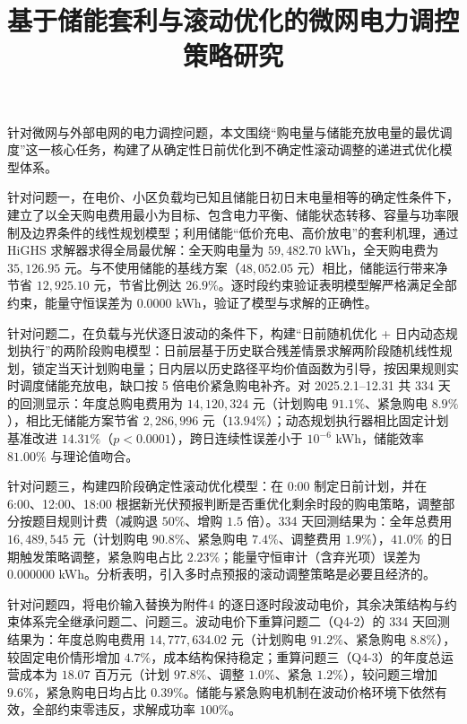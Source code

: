 \documentclass[zihao=-4,a4paper,UTF8,fontset=none]{ctexart}
\title{基于储能套利与滚动优化的微网电力调控策略研究}
\newcommand{\keywords}{微网调度；储能套利；线性规划；随机优化；动态规划}
\begin{document}
\maketitle

\begin{cumcmabstract}
针对微网与外部电网的电力调控问题，本文围绕“购电量与储能充放电量的最优调度”这一核心任务，构建了从确定性日前优化到不确定性滚动调整的递进式优化模型体系。

针对问题一，在电价、小区负载均已知且储能日初日末电量相等的确定性条件下，建立了以全天购电费用最小为目标、包含电力平衡、储能状态转移、容量与功率限制及边界条件的线性规划模型；利用储能“低价充电、高价放电”的套利机理，通过 HiGHS 求解器求得全局最优解：全天购电量为 $59{,}482.70$ kWh，全天购电费为 $35{,}126.95$ 元。与不使用储能的基线方案（$48{,}052.05$ 元）相比，储能运行带来净节省 $12{,}925.10$ 元，节省比例达 $26.9\%$。逐时段约束验证表明模型解严格满足全部约束，能量守恒误差为 $0.0000$ kWh，验证了模型与求解的正确性。

针对问题二，在负载与光伏逐日波动的条件下，构建“日前随机优化 + 日内动态规划执行”的两阶段购电模型：日前层基于历史联合残差情景求解两阶段随机线性规划，锁定当天计划购电量；日内层以历史路径平均价值函数为引导，按因果规则实时调度储能充放电，缺口按 5 倍电价紧急购电补齐。对 2025.2.1--12.31 共 334 天的回测显示：年度总购电费用为 $14{,}120{,}324$ 元（计划购电 $91.1\%$、紧急购电 $8.9\%$），相比无储能方案节省 $2{,}286{,}996$ 元（$13.94\%$）；动态规划执行器相比固定计划基准改进 $14.31\%$（$p<0.0001$），跨日连续性误差小于 $10^{-6}$ kWh，储能效率 $81.00\%$ 与理论值吻合。

针对问题三，构建四阶段确定性滚动优化模型：在 0:00 制定日前计划，并在 6:00、12:00、18:00 根据新光伏预报判断是否重优化剩余时段的购电策略，调整部分按题目规则计费（减购退 $50\%$、增购 $1.5$ 倍）。334 天回测结果为：全年总费用 $16{,}489{,}545$ 元（计划购电 $90.8\%$、紧急购电 $7.4\%$、调整费用 $1.9\%$），$41.0\%$ 的日期触发策略调整，紧急购电占比 $2.23\%$；能量守恒审计（含弃光项）误差为 $0.000000$ kWh。分析表明，引入多时点预报的滚动调整策略是必要且经济的。

针对问题四，将电价输入替换为附件4 的逐日逐时段波动电价，其余决策结构与约束体系完全继承问题二、问题三。波动电价下重算问题二（Q4-2）的 334 天回测结果为：年度总购电费用 $14{,}777{,}634.02$ 元（计划购电 $91.2\%$、紧急购电 $8.8\%$），较固定电价情形增加 $4.7\%$，成本结构保持稳定；重算问题三（Q4-3）的年度总运营成本为 $18.07$ 百万元（计划 $97.8\%$、调整 $1.0\%$、紧急 $1.2\%$），较问题三增加 $9.6\%$，紧急购电日均占比 $0.39\%$。储能与紧急购电机制在波动价格环境下依然有效，全部约束零违反，求解成功率 $100\%$。

\cumcmkeywords{\keywords}
\end{cumcmabstract}
\end{document}
